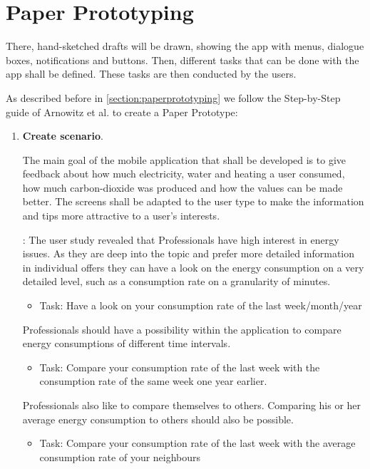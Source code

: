 \section{Paper Prototyping}
There, hand-sketched drafts will be drawn, showing the app with menus, dialogue boxes, notifications and buttons. Then, different tasks that can be done with the app shall be defined. These tasks are then conducted by the users.

As described before in \ref{section:paperprototyping} we follow the Step-by-Step guide of Arnowitz et al. \cite{arnowitz2010effective} to create a Paper Prototype:


\begin{enumerate}
	\item \textbf{Create scenario}.
	
	The main goal of the mobile application that shall be developed is to give feedback about how much electricity, water and heating a user consumed, how much carbon-dioxide was produced and how the values can be made better. The screens shall be adapted to the user type to make the information and tips more attractive to a user's interests.
	
	: The user study revealed that Professionals have high interest in energy issues. As they are deep into the topic and prefer more detailed information in individual offers they can have a look on the energy consumption on a very detailed level, such as a consumption rate on a granularity of minutes.
 
	\begin{itemize}
		\item Task: Have a look on your consumption rate of the last week/month/year
	\end{itemize}
	
	Professionals should have a possibility within the application to compare energy consumptions of different time intervals.
	
	\begin{itemize}
		\item Task: Compare your consumption rate of the last week with the consumption rate of the same week one year earlier.
	\end{itemize}

	Professionals also like to compare themselves to others. Comparing his or her average energy consumption to others should also be possible.
	
	\begin{itemize}
		\item Task: Compare your consumption rate of the last week with the average consumption rate of your neighbours
	\end{itemize}
	

\end{enumerate}
